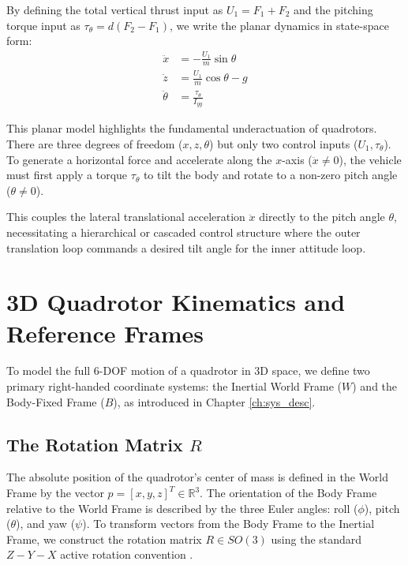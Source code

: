 By defining the total vertical thrust input as $U_1 = F_1 + F_2$ and the pitching torque input as $\tau_{\theta} = d(F_2 - F_1)$, we write the planar dynamics in state-space form:
\begin{align}
\ddot{x} &= -\frac{U_1}{m}\sin\theta \\
\ddot{z} &= \frac{U_1}{m}\cos\theta - g \\
\ddot{\theta} &= \frac{\tau_{\theta}}{I_{yy}}
\end{align}

This planar model highlights the fundamental underactuation of quadrotors. There are three degrees of freedom ($x, z, \theta$) but only two control inputs ($U_1, \tau_{\theta}$). To generate a horizontal force and accelerate along the $x$-axis ($\ddot{x} \neq 0$), the vehicle must first apply a torque $\tau_{\theta}$ to tilt the body and rotate to a non-zero pitch angle ($\theta \neq 0$). 

This couples the lateral translational acceleration $\ddot{x}$ directly to the pitch angle $\theta$, necessitating a hierarchical or cascaded control structure where the outer translation loop commands a desired tilt angle for the inner attitude loop.

\section{3D Quadrotor Kinematics and Reference Frames}
To model the full 6-DOF motion of a quadrotor in 3D space, we define two primary right-handed coordinate systems: the Inertial World Frame ($W$) and the Body-Fixed Frame ($B$), as introduced in Chapter \ref{ch:sys_desc}.

\subsection{\texorpdfstring{The Rotation Matrix $R$}{The Rotation Matrix R}}
The absolute position of the quadrotor's center of mass is defined in the World Frame by the vector $p = [x, y, z]^T \in \mathbb{R}^3$. The orientation of the Body Frame relative to the World Frame is described by the three Euler angles: roll ($\phi$), pitch ($\theta$), and yaw ($\psi$). To transform vectors from the Body Frame to the Inertial Frame, we construct the rotation matrix $R \in SO(3)$ using the standard $Z-Y-X$ active rotation convention \cite{ref_59}. 

